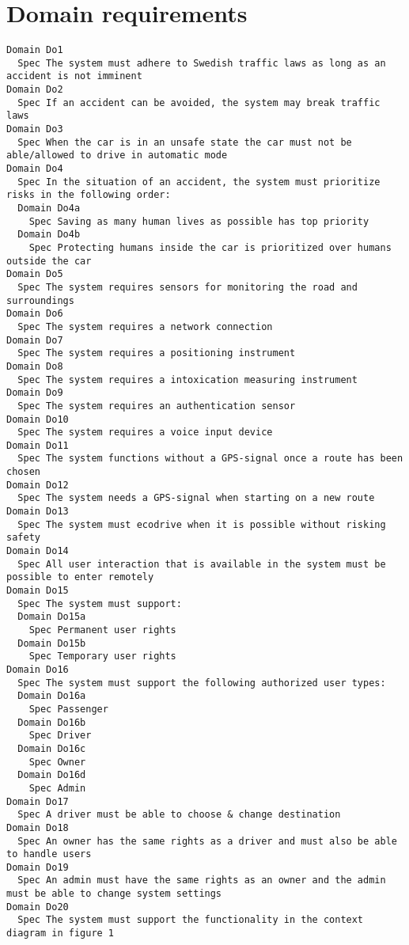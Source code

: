 
\begin{lstlisting}

\end{lstlisting}


       \section{Domain requirements}


\begin{lstlisting}
Domain Do1
  Spec The system must adhere to Swedish traffic laws as long as an accident is not imminent
Domain Do2
  Spec If an accident can be avoided, the system may break traffic laws
Domain Do3
  Spec When the car is in an unsafe state the car must not be able/allowed to drive in automatic mode
Domain Do4
  Spec In the situation of an accident, the system must prioritize risks in the following order:
  Domain Do4a
    Spec Saving as many human lives as possible has top priority
  Domain Do4b
    Spec Protecting humans inside the car is prioritized over humans outside the car
Domain Do5
  Spec The system requires sensors for monitoring the road and surroundings
Domain Do6
  Spec The system requires a network connection
Domain Do7
  Spec The system requires a positioning instrument
Domain Do8
  Spec The system requires a intoxication measuring instrument
Domain Do9
  Spec The system requires an authentication sensor
Domain Do10
  Spec The system requires a voice input device
Domain Do11
  Spec The system functions without a GPS-signal once a route has been chosen
Domain Do12
  Spec The system needs a GPS-signal when starting on a new route
Domain Do13
  Spec The system must ecodrive when it is possible without risking safety
Domain Do14
  Spec All user interaction that is available in the system must be possible to enter remotely
Domain Do15
  Spec The system must support:
  Domain Do15a
    Spec Permanent user rights
  Domain Do15b
    Spec Temporary user rights
Domain Do16
  Spec The system must support the following authorized user types:
  Domain Do16a
    Spec Passenger
  Domain Do16b
    Spec Driver
  Domain Do16c
    Spec Owner
  Domain Do16d
    Spec Admin
Domain Do17
  Spec A driver must be able to choose & change destination
Domain Do18
  Spec An owner has the same rights as a driver and must also be able to handle users
Domain Do19
  Spec An admin must have the same rights as an owner and the admin must be able to change system settings
Domain Do20
  Spec The system must support the functionality in the context diagram in figure 1

\end{lstlisting}


